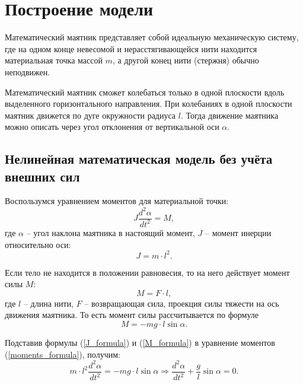 \pagebreak

\section{Построение модели}
	Математический маятник представляет собой идеальную механическую систему, где на одном конце невесомой и нерасстягивающейся нити находится материальная точка массой \( m \), а другой конец нити (стержня) обычно неподвижен. 

	Математический маятник сможет колебаться только в одной плоскости вдоль выделенного горизонтального направления. При колебаниях в одной плоскости маятник движется по дуге окружности радиуса \( l \). Тогда движение маятника можно описать через угол отклонения от вертикальной оси \( \alpha \).


	\subsection{Нелинейная математическая модель без учёта внешних сил}

		Воспользумся уравнением моментов для материальной точки:
		\begin{equation}
			J \dfrac{d^2 \alpha}{dt^2} = M, \label{moments_formula}
		\end{equation}
		где \( \alpha \) -- угол наклона маятника в настоящий момент, \( J \) -- момент инерции относительно оси:
		\begin{equation}
			J = m \cdot l^2. \label{J_formula}
		\end{equation}

		Если тело не находится в положении равновесия, то на него действует момент силы \( M \):
		\begin{equation}
			M = F \cdot l,
		\end{equation}
		где  \( l \) -- длина нити, \( F \) -- возвращающая сила, проекция силы тяжести на ось движения маятника. То есть момент силы рассчитывается по формуле
		\begin{equation}
			M = -mg \cdot l \sin \alpha. \label{M_formula}
		\end{equation}

		Подставив формулы (\ref{J_formula}) и (\ref{M_formula}) в уравнение моментов (\ref{moments_formula}), получим:
		\begin{equation}
			m \cdot l^2 \dfrac{d^2 \alpha}{dt^2} = -mg \cdot l\sin \alpha \Rightarrow \dfrac{d^2 \alpha}{dt^2} + \dfrac{g}{l} \sin \alpha = 0.
		\end{equation}

